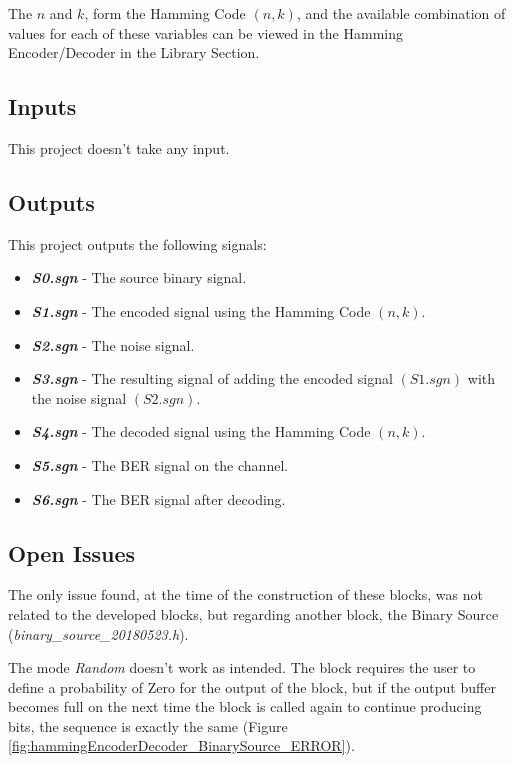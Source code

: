 \begin{refsection}
The $n$ and $k$, form the Hamming Code $(n, k)$, and the available combination of values for each of these variables can be viewed in the Hamming Encoder/Decoder in the Library Section.

\subsection*{Inputs}

This project doesn't take any input.

\subsection*{Outputs}

This project outputs the following signals:

\begin{itemize}
	\item \textbf{\textit{S0.sgn}} - The source binary signal.
	\item \textbf{\textit{S1.sgn}} - The encoded signal using the Hamming Code $(n, k)$.
	\item \textbf{\textit{S2.sgn}} - The noise signal.
	\item \textbf{\textit{S3.sgn}} - The resulting signal of adding the encoded signal $(S1.sgn)$ with the noise signal $(S2.sgn)$.
	\item \textbf{\textit{S4.sgn}} - The decoded signal using the Hamming Code $(n, k)$.
	\item \textbf{\textit{S5.sgn}} - The BER signal on the channel.
	\item \textbf{\textit{S6.sgn}} - The BER signal after decoding.
\end{itemize}

\subsection*{Open Issues}
\label{Open Issues}

The only issue found, at the time of the construction of these blocks, was not related to the developed blocks, but regarding another block, the Binary Source (\textit{binary\_source\_20180523.h}).

The mode \textit{Random} doesn't work as intended. The block requires the user to define a probability of Zero for the output of the block, but if the output buffer becomes full on the next time the block is called again to continue producing bits, the sequence is exactly the same (Figure \ref{fig:hammingEncoderDecoder_BinarySource_ERROR}).


\end{refsection}
